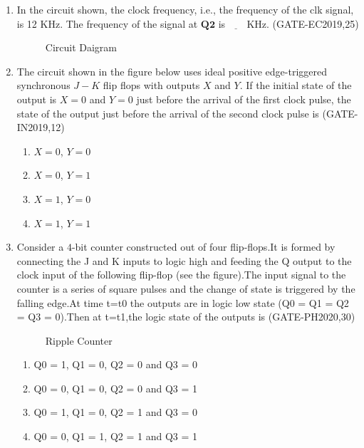 \begin{enumerate}
\item In the circuit shown, the clock frequency, i.e., the frequency of the clk signal, is 12 KHz. The frequency of the signal at $\mathbf{Q2}$ is $\underline{\hspace{18pt}}$ KHz.
		\hfill(GATE-EC2019,25)
		\begin{figure}[H]
			
			\caption{Circuit Daigram}
		\end{figure}

 \item The circuit shown in the figure below uses ideal positive edge-triggered synchronous $J-K$ flip flops with outputs $X$ and $Y$. If the initial state of the output is $X=0$ and $Y=0$ just before the arrival of the first clock pulse, the state of the output just before the arrival of the second clock pulse is
              \hfill(GATE-IN2019,12)
\begin{figure}[H]
    \centering
    
   

\end{figure}
\begin{enumerate}
    \item $X=0$, $Y=0$
    \item $X=0$, $Y=1$
    \item $X=1$, $Y=0$
    \item$X=1$, $Y=1$
\end{enumerate}

\item Consider a $4$-bit counter constructed out of four flip-flops.It is formed by connecting the J and K inputs to logic high and feeding the Q output to the clock input of the following flip-flop (see the figure).The input signal to the counter is a series of square pulses and the change of state is triggered by the falling edge.At time t=t0 the outputs are in logic low state (Q0 = Q1 = Q2 = Q3 = 0).Then at t=t1,the logic state of the outputs is 
		               \hfill(GATE-PH2020,30)
\begin{figure}[H]
    \centering

    \caption{Ripple Counter}
   
    \end{figure}
\begin{enumerate}
\item  Q0 = 1, Q1 = 0, Q2 = 0 and Q3 = 0 
\item  Q0 = 0, Q1 = 0, Q2 = 0 and Q3 = 1
\item  Q0 = 1, Q1 = 0, Q2 = 1 and Q3 = 0
\item  Q0 = 0, Q1 = 1, Q2 = 1 and Q3 = 1
\end{enumerate}





\end{enumerate}
